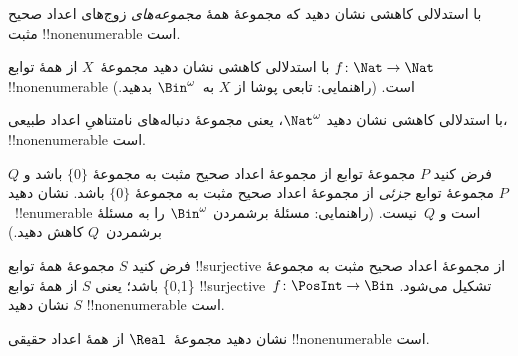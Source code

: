 \documentclass[../../../include/open-logic-section]{subfiles}
\begin{document}
\begin{prob}
با استدلالی کاهشی نشان دهید که مجموعهٔ همهٔ \emph{مجموعه‌های} زوج‌های
اعداد صحیح مثبت !!{nonenumerable} است.
\end{prob}

\begin{prob}\label{sfr:siz:red:prob:nat-nat}
  با استدلالی کاهشی نشان دهید مجموعهٔ~$X$ از همهٔ توابع
  $f\colon \Nat \to \Nat$ !!{nonenumerable} است. (راهنمایی: تابعی پوشا
  از $X$ به~$\Bin^\omega$ بدهید.)
\end{prob}

\begin{prob}
با استدلالی کاهشی نشان دهید $\Nat^\omega$، یعنی مجموعهٔ دنباله‌های
نامتناهیِ اعداد طبیعی، !!{nonenumerable} است.
\end{prob}

\begin{prob}
فرض کنید $P$ مجموعهٔ توابع از مجموعهٔ اعداد صحیح مثبت به مجموعهٔ
$\{0\}$ باشد و $Q$ مجموعهٔ توابع \emph{جزئی} از مجموعهٔ اعداد صحیح
مثبت به مجموعهٔ $\{0\}$ باشد. نشان دهید $P$~!!{enumerable} است و
$Q$~نیست. (راهنمایی: مسئلهٔ برشمردن $\Bin^\omega$ را به مسئلهٔ
برشمردن~$Q$ کاهش دهید.)
\end{prob}

\begin{prob}
فرض کنید $S$ مجموعهٔ همهٔ توابع !!{surjective} از مجموعهٔ اعداد صحیح
مثبت به مجموعهٔ \{0,1\} باشد؛ یعنی $S$ از همهٔ توابع
!!{surjective}~$f\colon \PosInt \to \Bin$ تشکیل می‌شود. نشان دهید $S$
!!{nonenumerable} است.
\end{prob}

\begin{prob}
نشان دهید مجموعهٔ~$\Real$ از همهٔ اعداد حقیقی !!{nonenumerable} است.
\end{prob}
\end{document}
